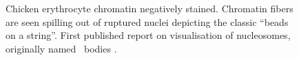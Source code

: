   \begin{figure}
    \centering
                 {Chicken erythrocyte chromatin negatively stained.
                  Chromatin fibers are seen spilling out of ruptured
                  nuclei depicting the classic ``beads on a string''.
                  First published report on
                  visualisation of nucleosomes, originally named
                  \textnu~bodies \citep{olins1974-nu-bodies}.}
    \label{fig:intro:beads-on-a-string}
  \end{figure}

